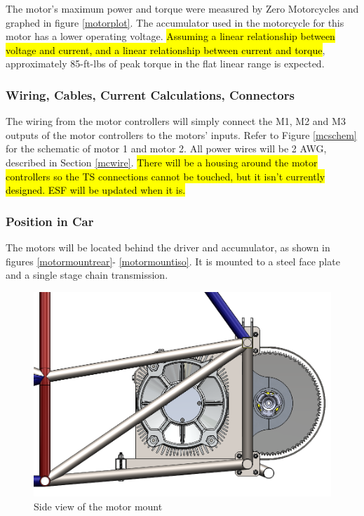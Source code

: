 \documentclass{article}
\DeclareRobustCommand{\hlr}[1]{{\sethlcolor{red}\hl{#1}}}
\begin{document}
            The motor's maximum power and torque were measured by Zero Motorcycles and graphed in figure \ref{motorplot}. The accumulator used in the motorcycle for this motor has a lower operating voltage. \hlr{Assuming a linear relationship between voltage and current, and a linear relationship between current and torque}, approximately 85-ft-lbs of peak torque in the flat linear range is expected.

        \subsubsection{Wiring, Cables, Current Calculations, Connectors} \label{motorswiring}


            The wiring from the motor controllers will simply connect the M1, M2 and M3 outputs of the motor controllers to the motors' inputs. Refer to Figure \ref{mcschem} for the schematic of motor 1 and motor 2. All power wires will be 2 AWG, described in Section \ref{mcwire}.
            \hlr{There will be a housing around the motor controllers so the TS connections cannot be touched, but it isn't currently designed. ESF will be updated when it is.}

        \subsubsection{Position in Car}

            The motors will be located behind the driver and accumulator, as shown in figures \ref{motormountrear}- \ref{motormountiso}. It is mounted to a steel face plate and a single stage chain transmission.

            \begin{figure}[H]
                \centering
                \includegraphics[width = 0.6 \textwidth]{motormount_sideview}
                \caption{Side view of the motor mount}
                \label{motormountside}
            \end{figure}
\end{document}
